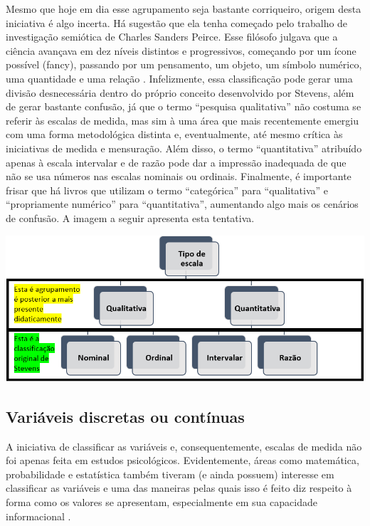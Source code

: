 \documentclass[
]{book}
\begin{document}
Mesmo que hoje em dia esse agrupamento seja bastante corriqueiro, origem desta iniciativa é algo incerta. Há sugestão que ela tenha começado pelo trabalho de investigação semiótica de Charles Sanders Peirce. Esse filósofo julgava que a ciência avançava em dez níveis distintos e progressivos, começando por um ícone possível (fancy), passando por um pensamento, um objeto, um símbolo numérico, uma quantidade e uma relação \citep[p.289]{smart1999}. Infelizmente, essa classificação pode gerar uma divisão desnecessária dentro do próprio conceito desenvolvido por Stevens, além de gerar bastante confusão, já que o termo ``pesquisa qualitativa'' não costuma se referir às escalas de medida, mas sim à uma área que mais recentemente emergiu com uma forma metodológica distinta e, eventualmente, até mesmo crítica às iniciativas de medida e mensuração. Além disso, o termo ``quantitativa'' atribuído apenas à escala intervalar e de razão pode dar a impressão inadequada de que não se usa números nas escalas nominais ou ordinais. Finalmente, é importante frisar que há livros que utilizam o termo ``categórica'' para ``qualitativa'' e ``propriamente numérico'' para ``quantitativa'', aumentando algo mais os cenários de confusão. A imagem a seguir apresenta esta tentativa.

\includegraphics{./img/cap_escala_medida_agrupamento.png}

\hypertarget{variuxe1veis-discretas-ou-contuxednuas}{%
\subsection{Variáveis discretas ou contínuas}\label{variuxe1veis-discretas-ou-contuxednuas}}

A iniciativa de classificar as variáveis e, consequentemente, escalas de medida não foi apenas feita em estudos psicológicos. Evidentemente, áreas como matemática, probabilidade e estatística também tiveram (e ainda possuem) interesse em classificar as variáveis e uma das maneiras pelas quais isso é feito diz respeito à forma como os valores se apresentam, especialmente em sua capacidade informacional \citep{morettin_bussab_2010}.
\end{document}
